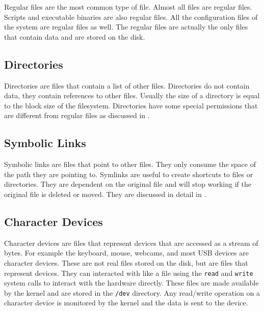 Regular files are the most common type of file.
Almost all files are regular files.
Scripts and executable binaries are also regular files.
All the configuration files of the system are regular files as well.
The regular files are actually the only files that contain data and are stored on the disk.

\subsection{Directories}

Directories are files that contain a list of other files.
Directories do not contain data, they contain references to other files.
Usually the size of a directory is equal to the block size of the filesystem.
Directories have some special permissions that are different from regular files as discussed in .

\subsection{Symbolic Links}

Symbolic links are files that point to other files.
They only consume the space of the path they are pointing to.
Symlinks
are useful to create shortcuts to files or directories.
They are dependent on the original file and will stop working if the original file is deleted or moved.
They are discussed in detail in .


\subsection{Character Devices}

Character devices are files that represent devices that are accessed as a stream of bytes.
For example the keyboard, mouse, webcams, and most USB devices are character devices.
These are not real files stored on the disk, but are files that represent devices.
They can interacted with like a file using the \texttt{read} and \texttt{write} system calls to interact with the hardware directly.
These files are made available by the kernel and are stored in the \texttt{/dev} directory.
Any read/write operation on a character device is monitored by the kernel and the data is sent to the device.

